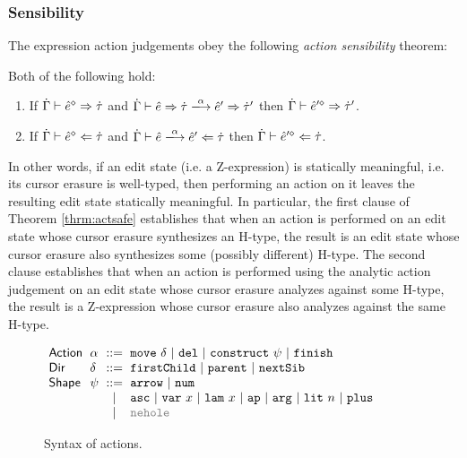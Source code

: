 \subsubsection{Sensibility}
The expression action judgements obey the following \emph{action sensibility} theorem:
\begin{theorem}\label{thrm:actsafe} Both of the following hold:\begin{enumerate}[itemsep=0px,partopsep=0px,topsep=0px]
\item If $\dot{\Gamma} \vdash \hat{e}^{\diamond} \Rightarrow \dot{\tau}$ and $\performSyn{\hGamma}{\zexp}{\htau}{\alpha}{\zexp'}{\htau'}$ 
   then
  $\dot{\Gamma} \vdash \hat{e}'^{\diamond} \Rightarrow \dot{\tau}'$.
\item If $\dot{\Gamma} \vdash \hat{e}^{\diamond} \Leftarrow \dot{\tau}$ and
   $\performAna{\hGamma}{\zexp}{\htau}{\alpha}{\zexp'}$ then
  $\dot{\Gamma} \vdash \hat{e}'^{\diamond} \Leftarrow \dot{\tau}$.
\end{enumerate}
\end{theorem}
\noindent In other words, if an edit state (i.e. a Z-expression) is statically meaningful, i.e. its cursor erasure is well-typed, then performing an action on it leaves the resulting edit state statically meaningful. In particular, the first clause of Theorem \ref{thrm:actsafe} establishes that when an action is performed on an edit state whose cursor erasure synthesizes an H-type, the result is an edit state whose cursor erasure also synthesizes some (possibly different) H-type. The second clause establishes that when an action is performed using the analytic action judgement on an edit state whose cursor erasure analyzes against some H-type, the result is a Z-expression whose cursor erasure also analyzes against the same H-type. %


\begin{figure}[t]
\hspace{-3px}$\arraycolsep=3pt\begin{array}{llcllll}
\mathsf{Action} & \alpha & ::= &
  \aMove{\delta} ~\vert~
  \aDel ~\vert~
  \aConstruct{\psi} ~\vert~
  \aFinish\\
\mathsf{Dir} & \delta & ::= &
  \dChild ~\vert~
  \dParent ~\vert~
  \dNext \\ %
\mathsf{Shape} & \psi & ::= &
  \farr ~\vert~
  \fnum \\
& & \vert &
  \fasc ~\vert~
  \fvar{x} ~\vert~
  \flam{x} ~\vert~
  \fap ~\vert~
  \farg ~\vert~
  \fnumlit{n} ~\vert~
  \fplus\\
& & \vert & 
  {\color{gray}\fnehole}
\end{array}$
\caption{Syntax of actions.}
\label{fig:action-syntax}
\end{figure}

